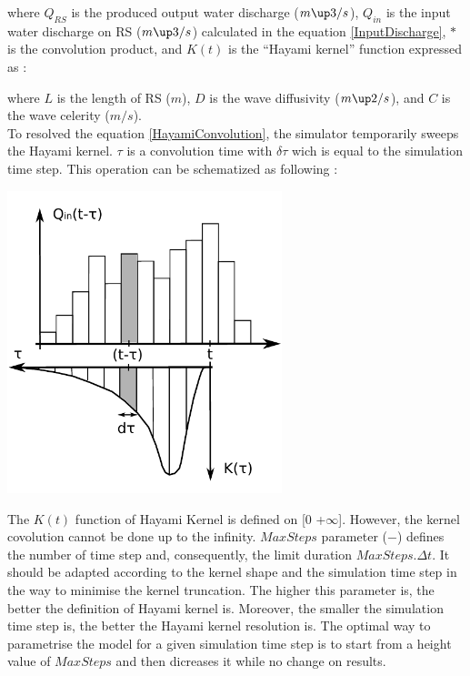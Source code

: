 

where $Q_{RS}$ is the produced output water discharge ($m\up3/s$), $Q_{in}$ is the input water discharge on RS ($m\up3/s$) calculated in the equation \ref{InputDischarge}, $*$ is the convolution product, and $K(t)$ is the ``Hayami kernel'' function expressed as :



where $L$ is the length of RS ($m$), $D$ is the wave diffusivity ($m\up2/s$), and $C$ is the wave celerity ($m/s$).\\

To resolved the equation \ref{HayamiConvolution}, the simulator temporarily sweeps the Hayami kernel. $\tau$ is a convolution time with $\delta \tau$ wich is equal to the simulation time step. This operation can be schematized as following :

\includegraphics[width=8cm]{common/Convolution_HayamiRS.pdf}

The $K(t)$ function of Hayami Kernel is defined on [0 +$\infty$]. However, the kernel covolution cannot be done up to the infinity. $MaxSteps$ parameter ($-$) defines the number of time step and, consequently, the limit duration $MaxSteps . \Delta t$. It should be adapted according to the kernel shape and the simulation time step in the way to minimise the kernel truncation. The higher this parameter is, the better the definition of Hayami kernel is. Moreover, the smaller the simulation time step is, the better the Hayami kernel resolution is. The optimal way to parametrise the model for a given simulation time step is to start from a height value of $MaxSteps$ and then dicreases it while no change on results.\\

